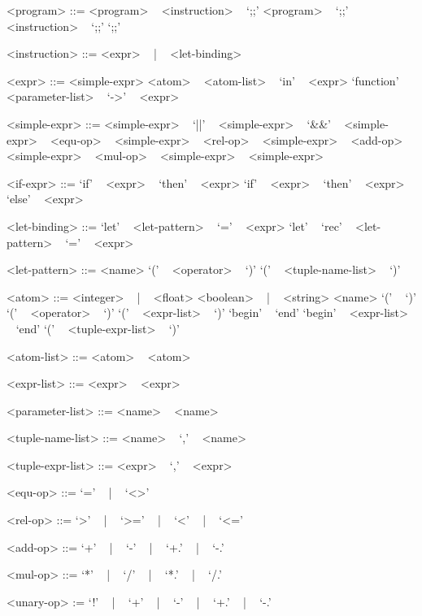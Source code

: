 \documentclass[paper=a4, fontsize=11pt]{scrartcl}
\numberwithin{equation}{section}		%
\numberwithin{figure}{section}			%
\numberwithin{table}{section}				%
\begin{document}
\begin{grammar}

<program> ::= <program> ~ <instruction> ~ `;;'
\alt <program> ~ `;;'
\alt <instruction> ~ `;;'
\alt `;;'

<instruction> ::= <expr> ~ | ~ <let-binding>

<expr> ::= <simple-expr>
\alt <atom> ~ <atom-list>
 ~ `in' ~ <expr>
\alt `function' ~ <parameter-list> ~ `->' ~ <expr>

<simple-expr> ::= <simple-expr> ~ `||' ~ <simple-expr>
 ~ `&&' ~ <simple-expr>
 ~ <equ-op> ~ <simple-expr>
 ~ <rel-op> ~ <simple-expr>
 ~ <add-op> ~ <simple-expr>
 ~ <mul-op> ~ <simple-expr>
 ~ <simple-expr>

<if-expr> ::= `if' ~ <expr> ~ `then' ~ <expr>
\alt `if' ~ <expr> ~ `then' ~ <expr> ~ `else' ~ <expr>

<let-binding> ::= `let' ~ <let-pattern> ~ `=' ~ <expr>
\alt `let' ~ `rec' ~ <let-pattern> ~ `=' ~ <expr>

<let-pattern> ::= <name>
\alt `(' ~ <operator> ~ `)'
\alt `(' ~ <tuple-name-list> ~ `)'

<atom> ::= <integer> ~ | ~ <float>
\alt <boolean> ~ | ~ <string>
\alt <name>
\alt `(' ~ `)'
\alt `(' ~ <operator> ~ `)'
\alt `(' ~ <expr-list> ~ `)'
\alt `begin' ~ `end'
\alt `begin' ~ <expr-list> ~ `end'
\alt `(' ~ <tuple-expr-list> ~ `)'

<atom-list> ::= <atom>
 ~ <atom>

<expr-list> ::= <expr>
 ~ <expr>

<parameter-list> ::= <name>
 ~ <name>

<tuple-name-list> ::= <name>
 ~ `,' ~ <name>

<tuple-expr-list> ::= <expr>
 ~ `,' ~ <expr>

<equ-op> ::= `=' ~ | ~ `<>'

<rel-op> ::= `>' ~ | ~ `>=' ~ | ~ `<' ~ | ~ `<='

<add-op> ::= `+' ~ | ~ `-' ~ | ~ `+.' ~ | ~ `-.'

<mul-op> ::= `*' ~ | ~ `/' ~ | ~ `*.' ~ | ~ `/.' 

<unary-op> := `!' ~ | ~ `+' ~ | ~ `-' ~ | ~ `+.' ~ | ~ `-.'

\end{grammar}
\end{document}
